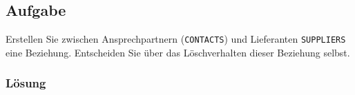 \subsection{Aufgabe}
\label{sec:uebung_05.aufgabe_07}
Erstellen Sie zwischen Ansprechpartnern (\texttt{CONTACTS}) und Lieferanten \texttt{SUPPLIERS} eine Beziehung. Entscheiden Sie über das Löschverhalten dieser Beziehung selbst.

\subsubsection*{Lösung}
\label{sec:uebung_05.aufgabe_07.loesung}
